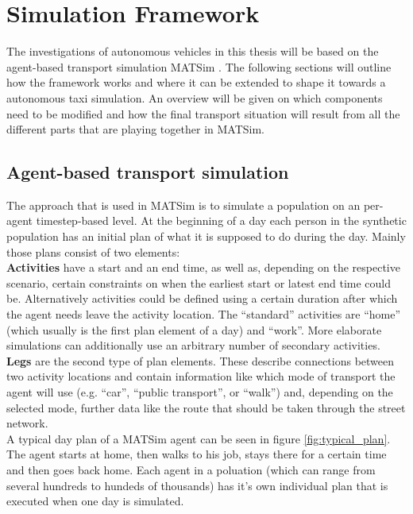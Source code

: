 \chapter{Simulation Framework}

The investigations of autonomous vehicles in this thesis will be based on the
agent-based transport simulation MATSim \cite{Horni2015}. The following sections
will outline how the framework works and where it can be extended to shape it
towards a autonomous taxi simulation. An overview will be given on which components
need to be modified and how the final transport situation will result from all
the different parts that are playing together in MATSim.

\section{Agent-based transport simulation}

The approach that is used in MATSim is to simulate a population on an per-agent
timestep-based level. At the beginning of a day each person in the synthetic
population has an initial plan of what it is supposed to do during the day. Mainly
those plans consist of two elements:\\

\textbf{Activities} have a start and an end time, as well as, depending on the
respective scenario, certain constraints on when the earliest start or latest
end time could be. Alternatively activities could be defined using a certain
duration after which the agent needs leave the activity location. The ``standard'' activities are
``home'' (which usually is the first plan element of a day) and ``work''. More
elaborate simulations can additionally use an arbitrary number of secondary
activities.\\

\textbf{Legs} are the second type of plan elements. These describe connections
between two activity locations and contain information like which mode of transport
the agent will use (e.g. ``car'', ``public transport'', or ``walk'') and, depending
on the selected mode, further data like the route that should be taken through
the street network.\\

A typical day plan of a MATSim agent can be seen in figure \ref{fig:typical_plan}. The
agent starts at home, then walks to his job, stays there for a certain time and then
goes back home. Each agent in a poluation (which can range from several hundreds to
hundeds of thousands) has it's own individual plan that is executed when one day
is simulated.

